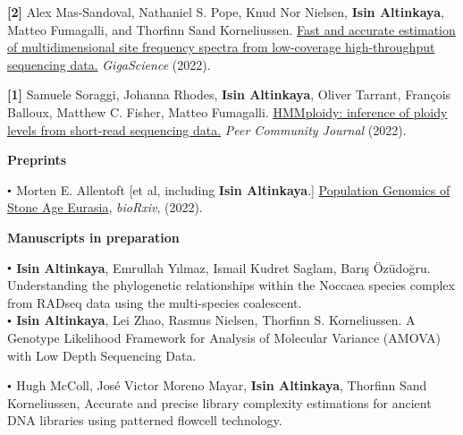 \documentclass[letterpaper,10.5pt]{article}
\newcommand\sbullet[1][.5]{\mathbin{\vcenter{\hbox{\scalebox{#1}{$\bullet$}}}}}
\begin{document}
\textbf{[2]} \hspace{0.42cm} Alex Mas-Sandoval, Nathaniel S. Pope, Knud Nor Nielsen, \textbf{Isin Altinkaya}, Matteo Fumagalli, and Thorfinn Sand Korneliussen. \href{https://doi.org/10.1093/gigascience/giac032}{Fast and accurate estimation of multidimensional site frequency spectra from low-coverage high-throughput sequencing data.} \textit{GigaScience} (2022).

\smallskip


\textbf{[1]} \hspace{0.42cm} Samuele Soraggi, Johanna Rhodes, \textbf{Isin Altinkaya}, Oliver Tarrant, François Balloux, Matthew C. Fisher, Matteo Fumagalli. \href{https://doi.org/10.24072/pcjournal.178}{HMMploidy: inference of ploidy levels from short-read sequencing data.} \textit{Peer Community Journal} (2022).\\
\medskip

\hspace{0.2cm} \textbf{Preprints} \\
\medskip

$\sbullet[.6]$ \hspace{0.74cm}  Morten E. Allentoft [et al, including \textbf{Isin Altinkaya}.]  \href{https://www.biorxiv.org/content/10.1101/2022.05.04.490594v5}{Population Genomics of Stone Age Eurasia}, \textit{bioRxiv}, (2022).\\

\medskip

\hspace{0.2cm} \textbf{Manuscripts in preparation} \\
\medskip


$\sbullet[.6]$ \hspace{0.74cm}  \textbf{Isin Altinkaya}, Emrullah Y{\i}lmaz, Ismail Kudret Saglam, Bar{\i}\c{s} \"{O}z\"{u}do\u{g}ru. Understanding the phylogenetic relationships within the Noccaea species complex from RADseq data using the multi-species coalescent. \\

\smallskip
$\sbullet[.6]$ \hspace{0.74cm}  \textbf{Isin Altinkaya}, Lei Zhao, Rasmus Nielsen, Thorfinn S. Korneliussen. A Genotype Likelihood Framework for Analysis of Molecular Variance (AMOVA) with Low Depth Sequencing Data. \\

\smallskip

$\sbullet[.6]$ \hspace{0.74cm}  Hugh McColl, Jos\'e Victor Moreno Mayar, \textbf{Isin Altinkaya}, Thorfinn Sand Korneliussen, Accurate and precise library complexity estimations for ancient DNA libraries using patterned flowcell technology. \\
\smallskip
\end{document}
